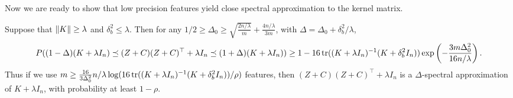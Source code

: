 Now we are ready to show that low precision features yield close spectral
approximation to the kernel matrix.

\begin{theorem}

  Suppose that $\|K\| \geq \lambda$ and $\delta^2_b \leq \lambda$.
  Then for any $1/2 \geq \Delta_0 \geq \sqrt{\frac{2n/\lambda}{m}} + \frac{4n/\lambda}{3m}$, with $\Delta =
  \Delta_0 + \delta^2_b / \lambda$,
  \begin{equation*}
    P((1 - \Delta)(K + \lambda I_n) \preceq (Z + C) (Z + C)^\top + \lambda I_n \preceq (1 + \Delta)(K + \lambda I_n)) \geq 1 - 16 \mathop{\rm tr}((K +
    \lambda I_n)^{-1} (K + \delta^2_b I_n)) \exp \left( -\frac{3m \Delta_0^2}{16n/\lambda} \right).
  \end{equation*}
  Thus if we use $m \geq \frac{16}{3 \Delta_0^2} n/\lambda \log (16 \mathop{\rm tr}((K + \lambda I_n)^{-1} (K +
  \delta^2_b I_n)) / \rho)$
  features, then $(Z + C) (Z + C)^\top + \lambda I_n$ is a $\Delta$-spectral approximation of $K + \lambda I_n$,
  with probability at least $1 - \rho$.
\end{theorem}

